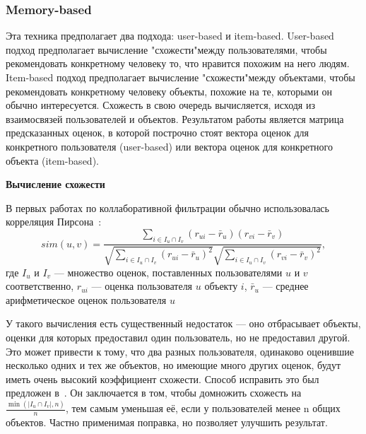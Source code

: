 \subsubsection{Memory-based}\label{subsubsec:memory-based}
Эта техника предполагает два подхода: user-based и item-based.
User-based подход предполагает вычисление "схожести"\space между пользователями, чтобы рекомендовать конкретному человеку то, что нравится похожим на него людям.
Item-based подход предполагает вычисление "схожести"\space между объектами, чтобы рекомендовать конкретному человеку объекты, похожие на те, которыми он обычно интересуется.
Схожесть в свою очередь вычисляется, исходя из взаимосвязей пользователей и объектов.
Результатом работы является матрица предсказанных оценок, в которой построчно стоят вектора оценок для конкретного пользователя (user-based) или вектора оценок для конкретного объекта (item-based).

\vspace{1em}
\textbf{Вычисление схожести}

В первых работах по коллаборативной фильтрации обычно использовалась корреляция Пирсона~\cite{resnick}:
\begin{equation}\label{eq:pearson}
    sim(u, v) = \frac
    {\sum_{i\in I_u\cap I_v}{(r_{ui} - \bar r_u)(r_{vi} - \bar r_v)}}
    {\sqrt{\sum_{i \in I_u \cap I_v}{(r_{ui} - \bar r_u)^2}}
    \sqrt{\sum_{i \in I_u \cap I_v}{(r_{vi} - \bar r_v)^2}}},
\end{equation}
где $I_u$ и $I_v$ --- множество оценок, поставленных пользователями $u$ и $v$ соответственно,
$r_{ui}$ --- оценка пользователя $u$ объекту $i$,
$\bar r_u$ --- среднее арифметическое оценок пользователя $u$

У такого вычисления есть существенный недостаток --- оно отбрасывает объекты, оценки для которых предоставил один пользователь, но не предоставил другой.
Это может привести к тому, что два разных пользователя, одинаково оценившие несколько одних и тех же объектов, но имеющие много других оценок, будут иметь очень высокий коэффициент схожести.
Способ исправить это был предложен в~\cite{herlocker}.
Он заключается в том, чтобы домножить схожесть на $\frac{\min(\mid I_u \cap I_v\mid, n)}{n}$, тем самым уменьшая её, если у пользователей менее n общих объектов.
Частно применимая поправка, но позволяет улучшить результат.

